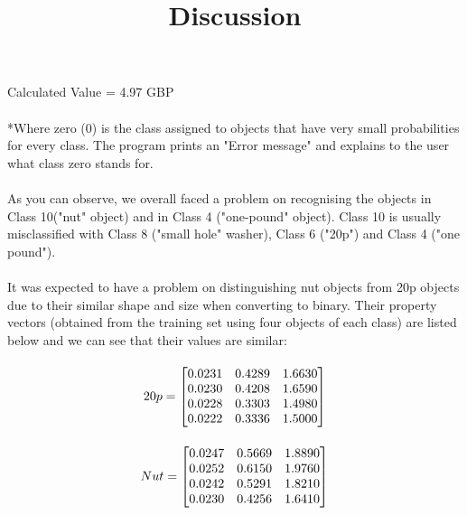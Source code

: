 \documentclass[11pt]{article}
\begin{document}
\paragraph{}
Calculated Value = 4.97 GBP
\paragraph{}
\paragraph{}
*Where zero (0) is the class assigned to objects that have very small probabilities for every class. The program prints an "Error message" and explains to the user what class zero stands for.
\newpage
\title{Discussion}\setlength{\droptitle}{-70pt}
\date{\vspace{-10ex}}
\maketitle

\paragraph{}
As you can observe, we overall faced a problem on recognising the objects in Class 10("nut" object) and in Class 4 ("one-pound" object). Class 10 is usually misclassified with Class 8 ("small hole" washer), Class 6 ("20p") and Class 4 ("one pound").
\paragraph{}
It was expected to have a problem on distinguishing nut objects from 20p objects due to their similar shape and size when converting to binary. Their property vectors (obtained from the training set using four objects of each class) are listed below and we can see that their values are similar:
\paragraph{}
\[
20p = 
	\setcounter{MaxMatrixCols}{3}
	\begin{bmatrix}
	0.0231 & 0.4289 & 1.6630\\
	0.0230 & 0.4208 & 1.6590\\
	0.0228 & 0.3303 & 1.4980\\
	0.0222 & 0.3336 & 1.5000\\
	\end{bmatrix}
\]
\paragraph{}
\[
Nut = 
	\setcounter{MaxMatrixCols}{3}
	\begin{bmatrix}
	0.0247 & 0.5669 & 1.8890\\
	0.0252 & 0.6150 & 1.9760\\
	0.0242 & 0.5291 & 1.8210\\
	0.0230 & 0.4256 & 1.6410\\
	\end{bmatrix}
\]
\end{document}
